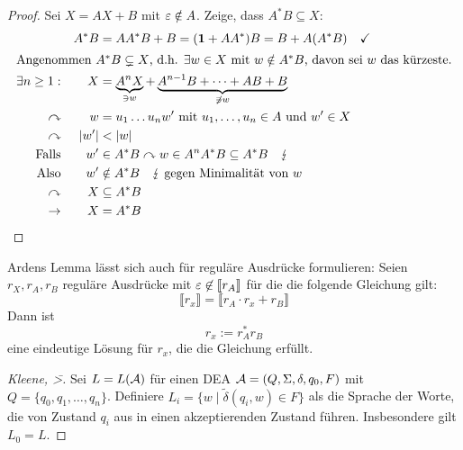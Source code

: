 {\begin{proof}
Sei $ X= AX+B$ mit $\varepsilon\notin A$. Zeige, dass $A^*B \subseteq X$:
        \begin{alignat*}{3}
                && A^*B &= AA^*B + B = (\1+AA^*)B = B+A(A^*B) \quad\checkmark\\
                \shortintertext{Angenommen $A^*B \subsetneq X$, d.h. $\exists w\in X$ mit $w\notin A^*B$, davon sei $w$ das kürzeste.}
                \exists n\geq 1: && X &= \underbrace{A^nX}_{\ni w} + \underbrace{A^{n-1}B+\dots +AB+B}_{\not\ni w}\\
                \curvearrowright && w &= u_1\dots u_n w'\text{ mit } u_1,\dots,u_n\in A\text{ und } w'\in X\\
                \curvearrowright && |w'| &< |w|\\
                \text{Falls}&& w'&\in A^*B \curvearrowright w\in A^nA^*B\subseteq A^*B \quad \lightning\\
                \text{Also} && w'&\notin A^*B \quad\lightning\text{ gegen Minimalität von }w\\
                \curvearrowright && X&\subseteq A^*B\\
                \-> && X &= A^*B \tag*{\qedhere}
        \end{alignat*}
\end{proof}

\begin{Korollar}
  Ardens Lemma lässt sich auch für reguläre Ausdrücke formulieren: Seien $r_X,r_A,r_B$ reguläre Ausdrücke mit $\varepsilon \not \in \llbracket r_A \rrbracket$ für die die folgende Gleichung gilt:
  \begin{displaymath}
    \llbracket r_x \rrbracket = \llbracket r_A \cdot r_x + r_B \rrbracket
  \end{displaymath}
  Dann ist 
  \begin{displaymath}
    r_x := r_A^*r_B
  \end{displaymath}
  eine eindeutige Lösung für $r_x$, die die Gleichung erfüllt.
\end{Korollar}


\begin{proof}[Kleene, \=>]
  Sei $L=L(\mathcal{A})$ für einen \ac{DEA} $\mathcal{A}=({Q},\Sigma,\delta,q_0,F)$ mit $Q = \{q_0,q_1,\dots,q_n\}$.
        Definiere $L_i=\{ w \mid \tilde\delta(q_i,w)\in F \}$ als die Sprache der Worte, die von Zustand $q_i$ aus in einen akzeptierenden Zustand führen.
  Insbesondere gilt $L_0 = L$.


\end{proof}}
